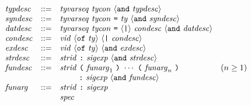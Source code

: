 \documentclass[twoside,titlepage]{article}
\begin{document}
\begin{appendix}
\begin{itemize}
$$\begin{array}{llll}
  \mathit{typdesc} & ::= & \mathit{tyvarseq}~\mathit{tycon}~\langle{\tt{and}}~\mathit{typdesc}\rangle \\
  \mathit{syndesc} & ::= & \mathit{tyvarseq}~\mathit{tycon}~\mbox{\tt=}~\mathit{ty}~\langle{\tt{and}}~\mathit{syndesc}\rangle \\
  \mathit{datdesc} & ::= & \mathit{tyvarseq}~\mathit{tycon}~\mbox{\tt=}~\langle\mbox{\tt|}\rangle~\mathit{condesc}~\langle{\tt{and}}~\mathit{datdesc}\rangle \\
  \mathit{condesc} & ::= & \mathit{vid}~\langle{\tt{of}}~\mathit{ty}\rangle~\langle\mbox{\tt|}~\mathit{condesc}\rangle \\
  \mathit{exdesc} & ::= & \mathit{vid}~\langle{\tt{of}}~\mathit{ty}\rangle~\langle{\tt{and}}~\mathit{exdesc}\rangle \\
  \mathit{strdesc} & ::= & \mathit{strid}~\mbox{\tt:}~\mathit{sigexp}~\langle{\tt{and}}~\mathit{strdesc}\rangle \\
  \mathit{fundesc} & ::= & \mathit{strid}~\mbox{\tt(}~\mathit{funarg}_1~\mbox{\tt)}~\cdots~\mbox{\tt(}~\mathit{funarg}_n~\mbox{\tt)} & (n\geq1) \\
  && ~~~~~~~\mbox{\tt:}~\mathit{sigexp}~\langle{\tt{and}}~\mathit{fundesc}\rangle \\
  \mathit{funarg} & ::= & \mathit{strid}~\mbox{\tt:}~\mathit{sigexp} \\
  && \mathit{spec} \\
  \end{array}
  $$


\end{itemize}
\end{appendix}
\end{document}
